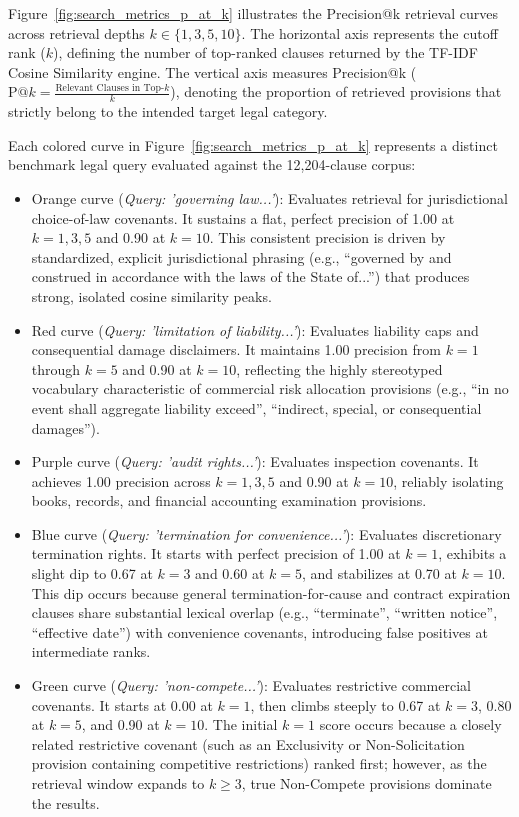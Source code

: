 

Figure~\ref{fig:search_metrics_p_at_k} illustrates the Precision@k retrieval curves across retrieval depths $k \in \{1, 3, 5, 10\}$. The horizontal axis represents the cutoff rank ($k$), defining the number of top-ranked clauses returned by the TF-IDF Cosine Similarity engine. The vertical axis measures Precision@k ($\text{P}@k = \frac{\text{Relevant Clauses in Top-}k}{k}$), denoting the proportion of retrieved provisions that strictly belong to the intended target legal category.

Each colored curve in Figure~\ref{fig:search_metrics_p_at_k} represents a distinct benchmark legal query evaluated against the 12,204-clause corpus:
\begin{itemize}
    \item Orange curve (\textit{Query: 'governing law...'}): Evaluates retrieval for jurisdictional choice-of-law covenants. It sustains a flat, perfect precision of 1.00 at $k=1, 3, 5$ and 0.90 at $k=10$. This consistent precision is driven by standardized, explicit jurisdictional phrasing (e.g., ``governed by and construed in accordance with the laws of the State of...'') that produces strong, isolated cosine similarity peaks.
    \item Red curve (\textit{Query: 'limitation of liability...'}): Evaluates liability caps and consequential damage disclaimers. It maintains 1.00 precision from $k=1$ through $k=5$ and 0.90 at $k=10$, reflecting the highly stereotyped vocabulary characteristic of commercial risk allocation provisions (e.g., ``in no event shall aggregate liability exceed'', ``indirect, special, or consequential damages'').
    \item Purple curve (\textit{Query: 'audit rights...'}): Evaluates inspection covenants. It achieves 1.00 precision across $k=1, 3, 5$ and 0.90 at $k=10$, reliably isolating books, records, and financial accounting examination provisions.
    \item Blue curve (\textit{Query: 'termination for convenience...'}): Evaluates discretionary termination rights. It starts with perfect precision of 1.00 at $k=1$, exhibits a slight dip to 0.67 at $k=3$ and 0.60 at $k=5$, and stabilizes at 0.70 at $k=10$. This dip occurs because general termination-for-cause and contract expiration clauses share substantial lexical overlap (e.g., ``terminate'', ``written notice'', ``effective date'') with convenience covenants, introducing false positives at intermediate ranks.
    \item Green curve (\textit{Query: 'non-compete...'}): Evaluates restrictive commercial covenants. It starts at 0.00 at $k=1$, then climbs steeply to 0.67 at $k=3$, 0.80 at $k=5$, and 0.90 at $k=10$. The initial $k=1$ score occurs because a closely related restrictive covenant (such as an Exclusivity or Non-Solicitation provision containing competitive restrictions) ranked first; however, as the retrieval window expands to $k \ge 3$, true Non-Compete provisions dominate the results.
\end{itemize}

